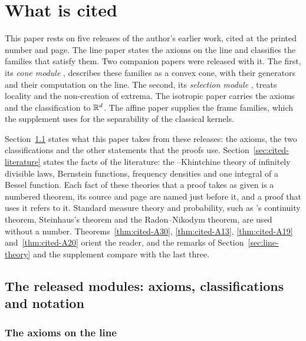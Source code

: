 \section{What is cited}
\label{ch:cited}

This paper rests on five releases of the author's earlier work, cited at the printed number and
page. The line paper  states the axioms on the line and classifies the
families that satisfy them. Two companion papers were released with it. The first, its
\emph{cone module} , describes these families as a convex cone, with their
generators and their computation on the line. The second, its \emph{selection module}
, treats locality and the non-creation of extrema. The isotropic
paper  carries the axioms and the classification to $\mathbb{R}^d$. The affine paper
 supplies the frame families, which the supplement uses for the separability
of the classical kernels.

Section~\ref{sec:cited} states what this paper takes from these releases: the axioms, the two
classifications and the other statements that the proofs use.
Section~\ref{sec:cited-literature} states the facts of the literature: the \Levy--Khintchine
theory of infinitely divisible laws, Bernstein functions, \Polya{} frequency densities and one
integral of a Bessel function. Each fact of these theories that a proof takes as given is a
numbered theorem, its source and page
are named just before it, and a proof that uses it refers to it. Standard measure theory and
probability, such as \Levy{}'s continuity theorem, Steinhaus's theorem and the Radon--Nikodym
theorem, are used without a number.
Theorems~\ref{thm:cited-A30}, \ref{thm:cited-A13}, \ref{thm:cited-A19} and~\ref{thm:cited-A20}
orient the reader, and the remarks of Section~\ref{sec:line-theory} and the supplement compare
with the last three.

\subsection{The released modules: axioms, classifications and notation}
\label{sec:cited}

\subsubsection{The axioms on the line}
\label{subsec:cited-line}

